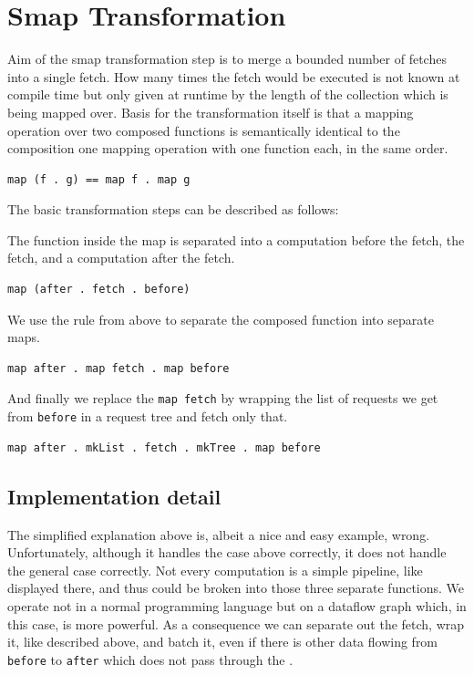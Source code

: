 \chapter{Smap Transformation}

\label{chapter:smap-transformation}

Aim of the smap transformation step is to merge a bounded number of fetches into a single fetch.
How many times the fetch would be executed is not known at compile time but only given at runtime by the length of the collection which is being mapped over.
Basis for the transformation itself is that a mapping operation over two composed functions is semantically identical to the composition one mapping operation with one function each, in the same order.

\begin{verbatim}
map (f . g) == map f . map g	
\end{verbatim}

The basic transformation steps can be described as follows:

The function inside the map is separated into a computation before the fetch, the fetch, and a computation after the fetch.

\begin{verbatim}
map (after . fetch . before)	
\end{verbatim}

We use the rule from above to separate the composed function into separate maps.

\begin{verbatim}
map after . map fetch . map before	
\end{verbatim}

And finally we replace the \texttt{map fetch} by wrapping the list of requests we get from \texttt{before} in a request tree and fetch only that.

\begin{verbatim}
map after . mkList . fetch . mkTree . map before	
\end{verbatim}

\section{Implementation detail}

The simplified explanation above is, albeit a nice and easy example, wrong.
Unfortunately, although it handles the case above correctly, it does not handle the general case correctly. 
Not every computation is a simple pipeline, like displayed there, and thus could be broken into those three separate functions.
We operate not in a normal programming language but on a dataflow graph which, in this case, is more powerful.
As a consequence we can separate out the fetch, wrap it, like described above, and batch it, even if there is other data flowing from \texttt{before} to \texttt{after} which does not pass through the \fetch{}.

